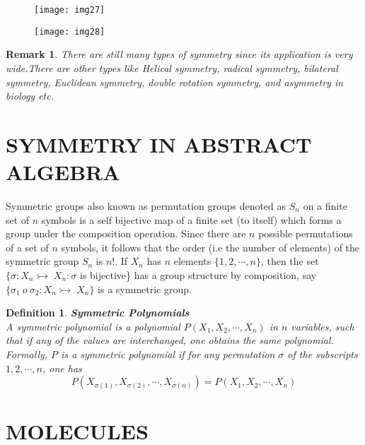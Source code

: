 \documentclass[a4paper, 12pt, openany]{report}
\newtheorem{rmk}{Remark}[section]
\newtheorem{defn}{Definition}[section]
\begin{document}
	\begin{figure}[H] \centering \texttt{[image: img27]} \hspace{0.05cm} \end{figure} 
	\begin{figure}[H] \centering \texttt{[image: img28]} \hspace{0.05cm} \end{figure} 
	 
	 \begin{rmk}There are still many types of symmetry since its application  is very wide.There are other types like Helical  symmetry, radical \break symmetry, bilateral symmetry, Euclidean symmetry, double rotation \break symmetry, and asymmetry in biology etc.
	  	\end{rmk} 
	 
	 	
	 		\section*{SYMMETRY IN ABSTRACT ALGEBRA}
	 	Symmetric groups also known as permutation groups denoted as $S_n$ on a finite set of $n$ symbols is a self bijective map of a finite set (to itself) which forms a group under the composition operation. Since there are $n$ possible permutations of a set of $n$ symbols, it follows that the order (i.e the number of elements) of the symmetric group $S_n$ is $n!$.
 	If $X_n$ has $n$ elements $\{1,2,\cdots,n\}$, then the set $\{\sigma: X_n\rightarrowtail\;X_n: \sigma$ is bijective\} has a group structure by composition, say  $\{\sigma_1\:o\:\sigma_2: X_n\rightarrowtail\;X_n\}$ is a symmetric group.
 		
 		\begin{defn}\textbf{Symmetric Polynomials}\\
 			A symmetric polynomial is a polynomial $P(X_1,X_2,\cdots, X_n)$ in $n$ variables, such that if any of the values are interchanged, one obtains the same \break polynomial.\\Formally, $P$ is a symmetric polynomial if for any permutation $\sigma$ of the \break subscripts $1,2,\cdots, n$, one has
 			 $$P(X_{\sigma(1)},X_{\sigma(2)},\cdots,X_{\sigma(n)})=P(X_1,X_2,\cdots, X_n)$$\end{defn}
 	
 
 \section{MOLECULES}
 
\end{document}
